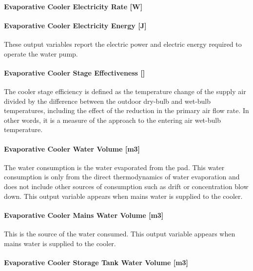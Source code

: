 \paragraph{Evaporative Cooler Electricity Rate {[}W{]}}\label{evaporative-cooler-electric-powerw-1}

\paragraph{Evaporative Cooler Electricity Energy {[}J{]}}\label{evaporative-cooler-electric-energy-j-1}

These output variables report the electric power and electric energy required to operate the water pump.

\paragraph{Evaporative Cooler Stage Effectiveness {[]}}\label{evaporative-cooler-stage-effectiveness}

The cooler stage efficiency is defined as the temperature change of the supply air divided by the difference between the outdoor dry-bulb and wet-bulb temperatures, including the effect of the reduction in the primary air flow rate. In other words, it is a measure of the approach to the entering air wet-bulb temperature.

\paragraph{Evaporative Cooler Water Volume {[}m3{]}}\label{evaporative-cooler-water-volume-m3-1}

The water consumption is the water evaporated from the pad. This water consumption is only from the direct thermodynamics of water evaporation and does not include other sources of consumption such as drift or concentration blow down. This output variable appears when mains water is supplied to the cooler.

\paragraph{Evaporative Cooler Mains Water Volume {[}m3{]}}\label{evaporative-cooler-mains-water-volume-m3-1}

This is the source of the water consumed. This output variable appears when mains water is supplied to the cooler.

\paragraph{Evaporative Cooler Storage Tank Water Volume {[}m3{]}}\label{evaporative-cooler-storage-tank-water-volume-m3-1}

